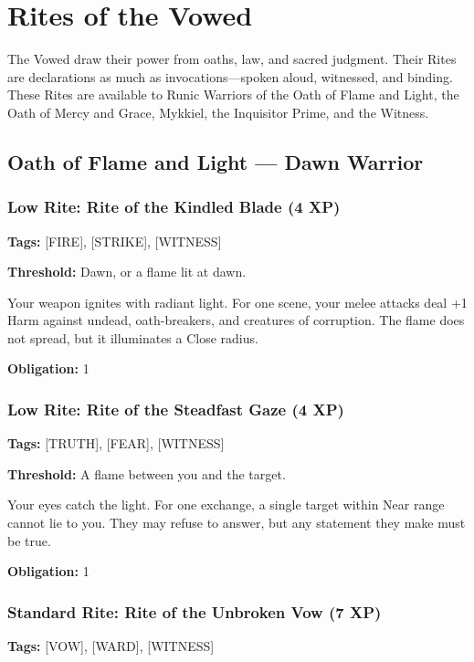 \section{Rites of the Vowed}

The Vowed draw their power from oaths, law, and sacred judgment. Their Rites are declarations as much as invocations—spoken aloud, witnessed, and binding. These Rites are available to Runic Warriors of the Oath of Flame and Light, the Oath of Mercy and Grace, Mykkiel, the Inquisitor Prime, and the Witness.

\subsection{Oath of Flame and Light — Dawn Warrior}

\subsubsection{Low Rite: Rite of the Kindled Blade (4 XP)}

\textbf{Tags:} [FIRE], [STRIKE], [WITNESS]

\textbf{Threshold:} Dawn, or a flame lit at dawn.

Your weapon ignites with radiant light. For one scene, your melee attacks deal +1 Harm against undead, oath-breakers, and creatures of corruption. The flame does not spread, but it illuminates a Close radius.

\textbf{Obligation:} 1

\subsubsection{Low Rite: Rite of the Steadfast Gaze (4 XP)}

\textbf{Tags:} [TRUTH], [FEAR], [WITNESS]

\textbf{Threshold:} A flame between you and the target.

Your eyes catch the light. For one exchange, a single target within Near range cannot lie to you. They may refuse to answer, but any statement they make must be true.

\textbf{Obligation:} 1

\subsubsection{Standard Rite: Rite of the Unbroken Vow (7 XP)}

\textbf{Tags:} [VOW], [WARD], [WITNESS]

